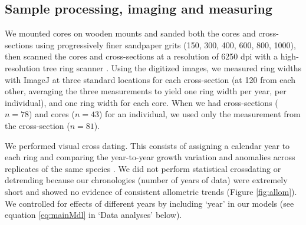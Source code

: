 \documentclass{article}\usepackage[]{graphicx}\usepackage[]{xcolor}
\begin{document}
\subsection*{Sample processing, imaging and measuring}
We mounted cores on wooden mounts and sanded both the cores and cross-sections using progressively finer sandpaper grits (150, 300, 400, 600, 800, 1000), then scanned the cores and cross-sections at a resolution of 6250 dpi with a high-resolution tree ring scanner \citep{fong_tim_2026}. Using the digitized images, we measured ring widths with ImageJ \citep{schneider_nih_2012} at three standard locations for each cross-section (at {120\degree} from each other, averaging the three measurements to yield one ring width per year, per individual), and one ring width for each core. When we had cross-sections ($n = 78$) and cores ($n = 43$) for an individual, we used only the measurement from the cross-section ($n = 81 $). 

We performed visual cross dating. This consists of assigning a calendar year to each ring and comparing the year-to-year growth variation and anomalies across replicates of the same species \citep{stokes_introduction_1996}. We did not perform statistical crossdating or detrending because our chronologies (number of years of data) were extremely short \citep{radenPotentialIntraannualDensity2020a} and showed no evidence of consistent allometric trends (Figure \ref{fig:allom}). We controlled for effects of different years by including `year' in our models (see equation \ref{eq:mainMdl} in `Data analyses' below).
\end{document}
